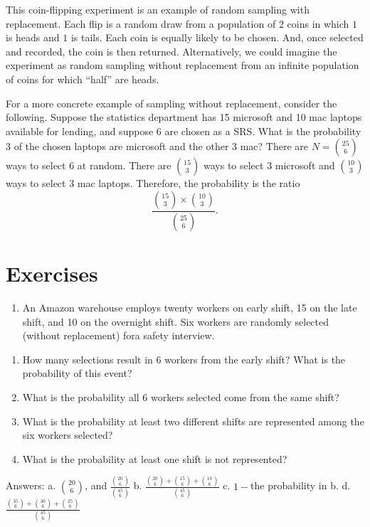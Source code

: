 \documentclass[]{book}
\providecommand{\tightlist}{%
  \setlength{\itemsep}{0pt}\setlength{\parskip}{0pt}}
\begin{document}
This coin-flipping experiment is an example of random sampling with
replacement. Each flip is a random draw from a population of \(2\) coins
in which \(1\) is heads and \(1\) is tails. Each coin is equally likely
to be chosen. And, once selected and recorded, the coin is then
returned. Alternatively, we could imagine the experiment as random
sampling without replacement from an infinite population of coins for
which ``half'' are heads.

For a more concrete example of sampling without replacement, consider
the following. Suppose the statistics department has 15 microsoft and 10
mac laptops available for lending, and suppose 6 are chosen as a SRS.
What is the probability 3 of the chosen laptops are microsoft and the
other 3 mac? There are \(N = {25 \choose 6}\) ways to select 6 at
random. There are \({15 \choose 3}\) ways to select 3 microsoft and
\({10 \choose 3}\) ways to select \(3\) mac laptops. Therefore, the
probability is the ratio
\[\frac{{15 \choose 3}\times {10 \choose 3}}{{25 \choose 6}}.\]

\section{Exercises}\label{exercises-1}

\begin{enumerate}
\def\labelenumi{\arabic{enumi}.}
\tightlist
\item
  An Amazon warehouse employs twenty workers on early shift, 15 on the
  late shift, and 10 on the overnight shift. Six workers are randomly
  selected (without replacement) fora safety interview. 
\end{enumerate}

\begin{enumerate}
\def\labelenumi{\alph{enumi}.}
\tightlist
\item
  How many selections result in 6 workers from the early shift? What is
  the probability of this event?
\item
  What is the probability all 6 workers selected come from the same
  shift?
\item
  What is the probability at least two different shifts are represented
  among the six workers selected?
\item
  What is the probability at least one shift is not represented?
\end{enumerate}

Answers: a. \({20 \choose 6}\), and
\(\frac{{20 \choose 6}}{{45 \choose 6}}\) b.
\(\frac{{20 \choose 6}+{15 \choose 6}+{10 \choose 6}}{{45 \choose 6}}\)
c. \(1-\)the probability in b. d.
\(\frac{{35 \choose 6}+{30 \choose 6}+{25 \choose 6}}{{45 \choose 6}}\)
\end{document}
